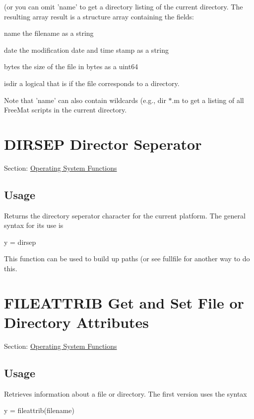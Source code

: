  (or you can omit {\ttfamily 'name'} to get a directory listing of the current directory. The resulting array {\ttfamily result} is a structure array containing the fields\-: 
\begin{DoxyItemize}
\item {\ttfamily name} the filename as a string  
\item {\ttfamily date} the modification date and time stamp as a string  
\item {\ttfamily bytes} the size of the file in bytes as a {\ttfamily uint64}  
\item {\ttfamily isdir} a logical that is {} if the file corresponds to a directory.  
\end{DoxyItemize}Note that {\ttfamily 'name'} can also contain wildcards (e.\-g., {\ttfamily dir $\ast$.m} to get a listing of all Free\-Mat scripts in the current directory. \hypertarget{os_dirsep}{}\section{D\-I\-R\-S\-E\-P Director Seperator}\label{os_dirsep}
Section\-: \hyperlink{sec_os}{Operating System Functions} \hypertarget{vtkwidgets_vtkxyplotwidget_Usage}{}\subsection{Usage}\label{vtkwidgets_vtkxyplotwidget_Usage}
Returns the directory seperator character for the current platform. The general syntax for its use is \begin{DoxyVerb}   y = dirsep
\end{DoxyVerb}
 This function can be used to build up paths (or see {\ttfamily fullfile} for another way to do this. \hypertarget{os_fileattrib}{}\section{F\-I\-L\-E\-A\-T\-T\-R\-I\-B Get and Set File or Directory Attributes}\label{os_fileattrib}
Section\-: \hyperlink{sec_os}{Operating System Functions} \hypertarget{vtkwidgets_vtkxyplotwidget_Usage}{}\subsection{Usage}\label{vtkwidgets_vtkxyplotwidget_Usage}
Retrieves information about a file or directory. The first version uses the syntax \begin{DoxyVerb}   y = fileattrib(filename)
\end{DoxyVerb}
